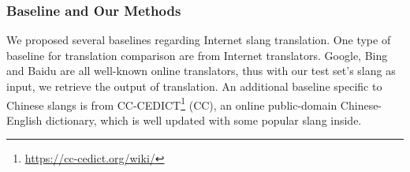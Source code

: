 %

\subsubsection{Baseline and Our Methods}

We proposed several baselines regarding Internet slang translation. 
One type of baseline for translation comparison are from Internet translators. Google, Bing and Baidu are all well-known online translators, thus with our test set's slang as input, we retrieve the output of translation.
An additional baseline specific to Chinese slangs is from CC-CEDICT\footnote{\url{https://cc-cedict.org/wiki/}} (CC), an online public-domain Chinese-English dictionary, which is well updated with some popular slang inside.

